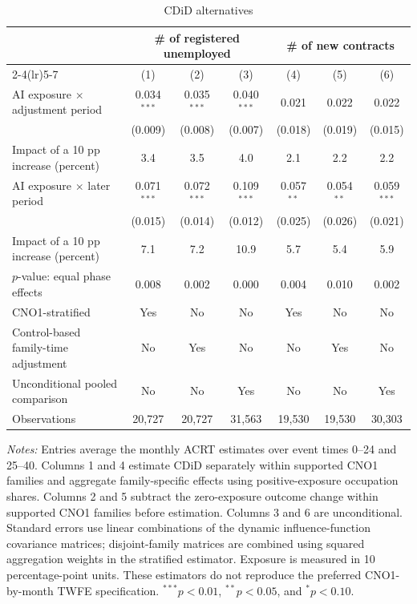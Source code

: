\begin{table}[!htbp]
\centering
\caption{CDiD alternatives}
\label{tab:v1_contdid_alternatives}
\begin{threeparttable}
\scriptsize
\setlength{\tabcolsep}{3.5pt}
\begin{tabular}{lcccccc}
\toprule
& \multicolumn{3}{c}{\# of registered unemployed} & \multicolumn{3}{c}{\# of new contracts} \\
\cmidrule(lr){2-4}\cmidrule(lr){5-7}
& (1) & (2) & (3) & (4) & (5) & (6) \\
\midrule
AI exposure $\times$ adjustment period & 0.034$^{***}$ & 0.035$^{***}$ & 0.040$^{***}$ & 0.021 & 0.022 & 0.022 \\
 & (0.009) & (0.008) & (0.007) & (0.018) & (0.019) & (0.015) \\
Impact of a 10 pp increase (percent) & 3.4 & 3.5 & 4.0 & 2.1 & 2.2 & 2.2 \\
\addlinespace
AI exposure $\times$ later period & 0.071$^{***}$ & 0.072$^{***}$ & 0.109$^{***}$ & 0.057$^{**}$ & 0.054$^{**}$ & 0.059$^{***}$ \\
 & (0.015) & (0.014) & (0.012) & (0.025) & (0.026) & (0.021) \\
Impact of a 10 pp increase (percent) & 7.1 & 7.2 & 10.9 & 5.7 & 5.4 & 5.9 \\
$p$-value: equal phase effects & 0.008 & 0.002 & 0.000 & 0.004 & 0.010 & 0.002 \\
\midrule
CNO1-stratified & Yes & No & No & Yes & No & No \\
Control-based family-time adjustment & No & Yes & No & No & Yes & No \\
Unconditional pooled comparison & No & No & Yes & No & No & Yes \\
Observations & 20,727 & 20,727 & 31,563 & 19,530 & 19,530 & 30,303 \\
\bottomrule
\end{tabular}
\begin{tablenotes}[flushleft]
\footnotesize
\item \emph{Notes:} Entries average the monthly ACRT estimates over event times 0--24 and 25--40. Columns 1 and 4 estimate CDiD separately within supported CNO1 families and aggregate family-specific effects using positive-exposure occupation shares. Columns 2 and 5 subtract the zero-exposure outcome change within supported CNO1 families before estimation. Columns 3 and 6 are unconditional. Standard errors use linear combinations of the dynamic influence-function covariance matrices; disjoint-family matrices are combined using squared aggregation weights in the stratified estimator. Exposure is measured in 10 percentage-point units. These estimators do not reproduce the preferred CNO1-by-month TWFE specification. $^{***}p<0.01$, $^{**}p<0.05$, and $^{*}p<0.10$.
\end{tablenotes}
\end{threeparttable}
\end{table}
